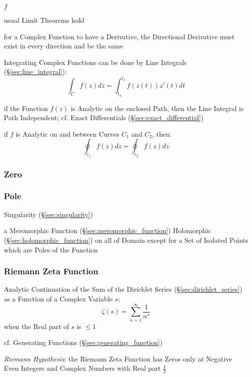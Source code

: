 $f$

usual Limit Theorems hold

for a Complex Function to have a Derivative, the Directional Derivative must
exist in every direction and be the same

Integrating Complex Functions can be done by Line Integrals
(\S\ref{sec:line_integral}):
\[
  \int_{C} f(z) dz = \int_{t_0}^{t_1} f(z(t)) z'(t) dt
\]

if the Function $f(z)$ is Analytic on the enclosed Path, then the Line Integral
is Path Independent; cf. Exact Differentials (\S\ref{sec:exact_differential})

if $f$ is Analytic on and between Curves $C_1$ and $C_2$, then:
\[
  \oint_{c_1} f(z) dz = \oint_{c_2} f(z) dz
\]



\subsubsection{Zero}\label{sec:complex_zero}

\subsubsection{Pole}\label{sec:complex_pole}

Singularity (\S\ref{sec:singularity})

a Meromorphic Function (\S\ref{sec:meromorphic_function}) Holomorphic
(\S\ref{sec:holomorphic_function}) on all of Domain except for a Set of
Isolated Points which are Poles of the Function



\subsubsection{Riemann Zeta Function}\label{sec:riemann_zeta}

Analytic Continuation of the Sum of the Dirichlet Series
(\S\ref{sec:dirichlet_series}) as a Function of a Complex Variable $s$:
\[
  \zeta(s) = \sum_{n=1}^\infty \frac{1}{n^s}
\]
when the Real part of $s$ is $\leq 1$

\fist cf. Generating Functions (\S\ref{sec:generating_function})

\emph{Riemann Hypothesis}: the Riemann Zeta Function has Zeros only at Negative
Even Integers and Complex Numbers with Real part $\frac{1}{2}$



